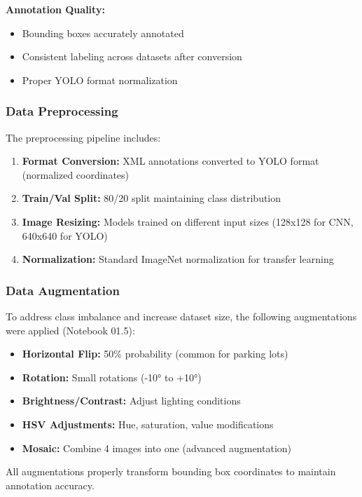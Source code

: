 \documentclass[12pt,a4paper]{article}
\begin{document}
\textbf{Annotation Quality:}
\begin{itemize}
    \item Bounding boxes accurately annotated
    \item Consistent labeling across datasets after conversion
    \item Proper YOLO format normalization
\end{itemize}

\subsubsection{Data Preprocessing}

The preprocessing pipeline includes:
\begin{enumerate}
    \item \textbf{Format Conversion:} XML annotations converted to YOLO format (normalized coordinates)
    \item \textbf{Train/Val Split:} 80/20 split maintaining class distribution
    \item \textbf{Image Resizing:} Models trained on different input sizes (128x128 for CNN, 640x640 for YOLO)
    \item \textbf{Normalization:} Standard ImageNet normalization for transfer learning
\end{enumerate}

\subsubsection{Data Augmentation}

To address class imbalance and increase dataset size, the following augmentations were applied (Notebook 01.5):

\begin{itemize}
    \item \textbf{Horizontal Flip:} 50\% probability (common for parking lots)
    \item \textbf{Rotation:} Small rotations (-10° to +10°)
    \item \textbf{Brightness/Contrast:} Adjust lighting conditions
    \item \textbf{HSV Adjustments:} Hue, saturation, value modifications
    \item \textbf{Mosaic:} Combine 4 images into one (advanced augmentation)
\end{itemize}

All augmentations properly transform bounding box coordinates to maintain annotation accuracy.
\end{document}
